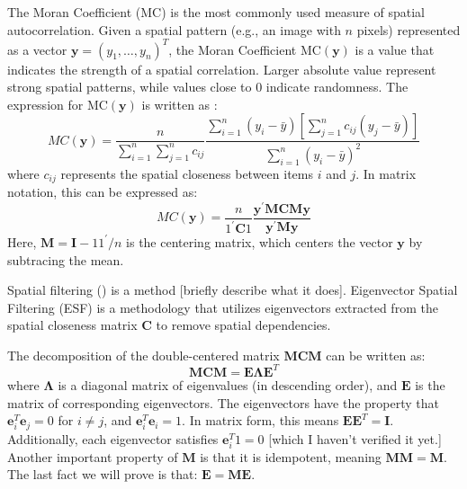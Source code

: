 \documentclass[12pt]{article}
\begin{document}
The Moran Coefficient (MC) is the most commonly used measure of spatial autocorrelation. Given a spatial pattern (e.g., an image with \( n \) pixels) represented as a vector \( \mathbf{y}=\left(y_1, \ldots, y_n\right)^T \), the Moran Coefficient \( \text{MC} (\mathbf{y}) \) is a value that indicates the strength of a spatial correlation. Larger absolute value represent strong spatial patterns, while values close to 0 indicate randomness. The expression for \( \text{MC} (\mathbf{y}) \) is written as \cite{Griffith_Chun_2014}:
\[
  M C(\mathbf{y})=\frac{n}{\sum_{i=1}^n \sum_{j=1}^n c_{i j}} \frac{\sum_{i=1}^n\left(y_i-\bar{y}\right)\left[\sum_{j=1}^n c_{i j}\left(y_j-\bar{y}\right)\right]}{\sum_{i=1}^n\left(y_i-\bar{y}\right)^2}
\]
where \( c_{ij} \) represents the spatial closeness between items \( i \) and \( j \). In matrix notation, this can be expressed as:
\[
  M C(\mathbf{y})=\frac{n}{1^{\prime} \mathbf{C} 1} \frac{\mathbf{y}^{\prime} \mathbf{M C M y}}{\mathbf{y}^{\prime} \mathbf{My}}
\]
Here, \( \mathbf{M}=\mathbf{I}-11^{\prime} / n \) is the centering matrix, which centers the vector \( \mathbf{y} \) by subtracing the mean.

Spatial filtering (\cite{Tiefelsdorf_Griffith_2007}) is a method [briefly describe what it does]. Eigenvector Spatial Filtering (ESF) is a methodology that utilizes eigenvectors extracted from the spatial closeness matrix \( \mathbf{C} \) to remove spatial dependencies. 

The decomposition of the double-centered matrix \( \mathbf{M C M} \) can be written as:
\[
  \mathbf{M C M}=\mathbf{E} \boldsymbol{\Lambda} \mathbf{E}^{T}
\]
where \( \boldsymbol{\Lambda} \) is a diagonal matrix of eigenvalues (in descending order), and \( \mathbf{E} \) is the matrix of corresponding eigenvectors. The eigenvectors have the property that \( \mathbf{e}_i^T \mathbf{e}_j=0 \) for \( i \neq j \), and \( \mathbf{e}_i^T \mathbf{e}_i=1 \). In matrix form, this means \( \mathbf{E E}^T=\mathbf{I} \). Additionally, each eigenvector satisfies \( \mathbf{e}_i^T 1 = 0 \) [which I haven't verified it yet.] Another important property of \(\mathbf{M}\) is that it is idempotent, meaning \(\mathbf{M M}=\mathbf{M}\). The last fact we will prove is that: \( \mathbf{E}=\mathbf{M E} \).
\end{document}
